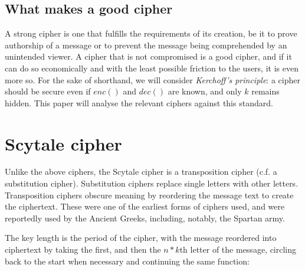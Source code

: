 \documentclass{AIAA}
\begin{document}
\subsection{What makes a good cipher}

A strong cipher is one that fulfills the requirements of its creation, be it to prove authorship of a message or to prevent the message being comprehended by an unintended viewer. A cipher that is not compromised is a good cipher, and if it can do so economically and with the least possible friction to the users, it is even more so. For the sake of shorthand, we will consider \textit{Kerchoff's principle}: a cipher should be secure even if $enc()$ and $dec()$ are known, and only $k$ remains hidden. This paper will analyse the relevant ciphers against this standard.

\section{Scytale cipher}
Unlike the above ciphers, the Scytale cipher is a transposition cipher (c.f. a substitution cipher). Substitution ciphers replace single letters with other letters. Transposition ciphers obscure meaning by reordering the message text to create the ciphertext. These were one of the earliest forms of ciphers used, and were reportedly used by the Ancient Greeks, including, notably, the Spartan army.

The key length is the period of the cipher, with the message reordered into ciphertext by taking the first, and then the $n * k$th letter of the message, circling back to the start when necessary and continuing the same function:
\end{document}
